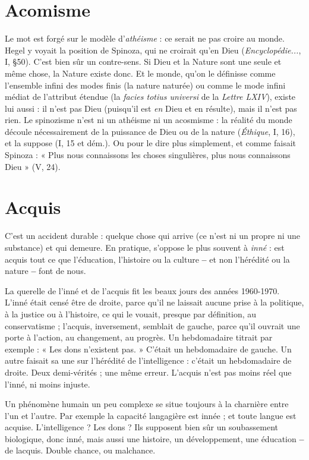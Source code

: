 \section{Acomisme}
Le mot est forgé sur le modèle d’{\it athéisme} : ce serait ne pas
croire au monde. Hegel y voyait la position de Spinoza, qui
ne croirait qu’en Dieu ({\it Encyclopédie...}, I, \S 50). C’est bien sûr un contre-sens.
Si Dieu et la Nature sont une seule et même chose, la Nature existe
donc. Et le monde, qu’on le définisse comme l’ensemble infini des modes
finis (la nature naturée) ou comme le mode infini médiat de l'attribut
étendue (la {\it facies totius universi} de la {\it Lettre LXIV}), existe lui aussi : il n’est
pas Dieu (puisqu'il est {\it en} Dieu et en résulte), mais il n’est pas rien. Le spinozisme
n’est ni un athéisme ni un acosmisme : la réalité du monde découle
nécessairement de la puissance de Dieu ou de la nature ({\it Éthique}, I, 16), et
la suppose (I, 15 et dém.). Ou pour le dire plus simplement, et comme faisait
Spinoza : « Plus nous connaissons les choses singulières, plus nous connaissons
Dieu » (V, 24).

\section{Acquis}
C’est un accident durable : quelque chose qui arrive (ce n'est ni un
propre ni une substance) et qui demeure. En pratique, s’oppose le
plus souvent à {\it inné} : est acquis tout ce que l’éducation, l’histoire ou la culture
{\bf --} et non l’hérédité ou la nature {\bf --} font de nous.

La querelle de l’inné et de l’acquis fit les beaux jours des années 1960-1970.
L’inné était censé être de droite, parce qu’il ne laissait aucune prise à la politique,
à la justice ou à l’histoire, ce qui le vouait, presque par définition, au
conservatisme ; l’acquis, inversement, semblait de gauche, parce qu’il ouvrait
une porte à l’action, au changement, au progrès. Un hebdomadaire titrait par
exemple : « Les dons n’existent pas. » C'était un hebdomadaire de gauche. Un
autre faisait sa une sur l’hérédité de l'intelligence : c'était un hebdomadaire de
droite. Deux demi-vérités ; une même erreur. L’acquis n’est pas moins réel que
l’inné, ni moins injuste.

Un phénomène humain un peu complexe se situe toujours à la charnière
entre l’un et l’autre. Par exemple la capacité langagière est innée ; et toute
langue est acquise. L'intelligence ? Les dons ? Ils supposent bien sûr un soubassement
biologique, donc inné, mais aussi une histoire, un développement, une
éducation {\bf --} de lacquis. Double chance, ou malchance.

